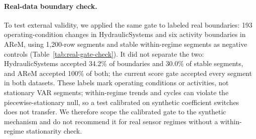\documentclass[sigconf,anonymous]{acmart}
\begin{document}
\paragraph{Real-data boundary check.}
\label{sec:real-gate-check}
To test external validity, we applied the same gate to labeled real boundaries: 193 operating-condition changes in HydraulicSystems and six activity boundaries in AReM, using 1,200-row segments and stable within-regime segments as negative controls (Table~\ref{tab:real-gate-check}).
It did not separate the two: HydraulicSystems accepted 34.2\% of boundaries and 30.0\% of stable segments, and AReM accepted 100\% of both; the current score gate accepted every segment in both datasets.
These labels mark operating conditions or activities, not stationary VAR segments; within-regime trends and cycles can violate the piecewise-stationary null, so a test calibrated on synthetic coefficient switches does not transfer.
We therefore scope the calibrated gate to the synthetic mechanism and do not recommend it for real sensor regimes without a within-regime stationarity check.

\begin{table}[t]
\caption{Real-data boundary check for the change-point gate. Segments are 1,200 rows; stable segments are drawn from within-regime runs. B/S is boundary/stable acceptance. Acceptance is the fraction with change-point $p<0.05$ (calibrated) or a two-state decision (score gate).}
\label{tab:real-gate-check}
\centering
\small
\resizebox{\linewidth}{!}{}
\end{table}

\begin{table}[t]
\caption{Default gate on eight prespecified conditions, twenty new seeds each. ``Fallback only'' excludes primary-path acceptances. Acceptance on a stationary series is false splitting. Edge AUC uses each condition's graph truth; it is not a between-condition treatment effect.}
\label{tab:gate-stress}
\centering
\small
\resizebox{\linewidth}{!}{}
\end{table}
\end{document}
